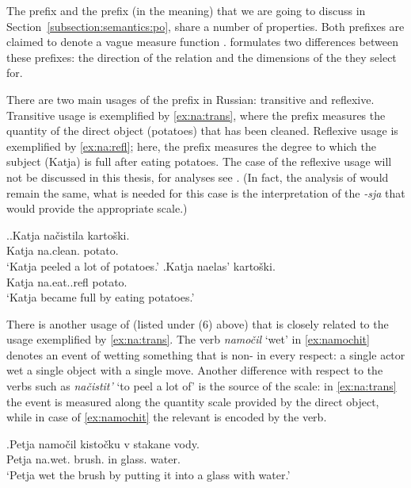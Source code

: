 The  prefix  and the prefix  (in the  meaning) that we are going to discuss in Section~\ref{subsection:semantics:po}, share a number of properties. Both prefixes are claimed to denote a vague measure function \citep{Filip:00, Souchkova:04}. \citet{Souchkova:04} formulates two differences between these prefixes: the direction of the relation and the dimensions of the  they select for.

There are two main usages of the  prefix  in Russian: transitive and reflexive. Transitive usage is exemplified by \ref{ex:na:trans}, where the prefix measures the quantity of the direct object (potatoes) that has been cleaned. Reflexive usage is exemplified by \ref{ex:na:refl}; here, the prefix  measures the degree to which the subject (Katja) is full after eating potatoes. The case of the reflexive usage will not be discussed in this thesis, for analyses see \citet{KaganPereltsvaig:11a,KaganPereltsvaig:11b,Souchkova:04,Filip:00,Filip:05}. (In fact, the analysis of  would remain the same, what is needed for this case is the interpretation of the  \textit{-sja} that would provide the appropriate scale.)

\ex.\ag.\label{ex:na:trans}Katja na\v{c}istila karto\v{s}ki.\\
Katja na.clean. potato.\\
\trans `Katja peeled a lot of potatoes.'
\bg.\label{ex:na:refl}Katja naelas' karto\v{s}ki.\\
Katja na.eat..refl potato.\\
\trans `Katja became full by eating potatoes.'

There is another usage of  (listed under (6) above) that is closely related to the  usage exemplified by \ref{ex:na:trans}. The verb \textit{namo\v{c}il} `wet' in \ref{ex:namochit} denotes an event of wetting something that is non- in every respect: a single actor wet a single object with a single move. Another difference with respect to the verbs such as \textit{na\v{c}istit'} `to peel a lot of' is the source of the scale: in \ref{ex:na:trans} the event is measured along the quantity scale provided by the direct object, while in case of \ref{ex:namochit} the relevant  is encoded by the verb.

\exg.\label{ex:namochit}Petja namo\v{c}il kisto\v{c}ku v stakane vody.\\
Petja na.wet. brush. in glass. water.\\
\trans `Petja wet the brush by putting it into a glass with water.'

